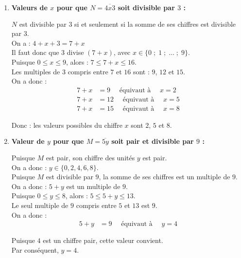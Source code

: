 \documentclass[10pt, a4paper]{article}
\begin{document}
\begin{Solution}[APPLICATION][6]
\begin{enumerate}[leftmargin=*,itemsep=0.5pt]
    \item \textbf{Valeurs de $x$ pour que $N = \overline{4x3}$ soit divisible par $3$ :}

    $N$ est divisible par $3$ si et seulement si la somme de ses chiffres est divisible par $3$. \\
    On a : $4 + x + 3 = 7 + x$ \\
    Il faut donc que $3$ divise $(7 + x)$, avec $x \in \big\{0 \; ; \; 1 \; ; \; \ldots \; ; \; 9\big\}$. \\
    Puisque $0 \leq x \leq 9$, alors : $7 \leq 7 + x \leq 16$. \\
    Les multiples de $3$ compris entre $7$ et $16$ sont : $9$, $12$ et $15$. \\
    On a donc :
    \begin{align*}
        7 + x &= 9 \quad \text{ équivaut à } \quad x = 2 \\
        7 + x &= 12 \quad \text{ équivaut à } \quad x = 5 \\
        7 + x &= 15 \quad \text{ équivaut à } \quad x = 8
    \end{align*}
    
    Donc : \quad les valeurs possibles du chiffre $x$ sont $2$, $5$ et $8$.

    \item \textbf{Valeur de $y$ pour que $M = \overline{5y}$ soit pair et divisible par $9$ :}

    Puisque $M$ est pair, son chiffre des unités $y$ est pair. \\
    On a donc : $y \in \big\{0, 2, 4, 6, 8\big\}$. \\
    Puisque $M$ est divisible par $9$, la somme de ses chiffres est un multiple de $9$. \\
    On a donc : $5 + y$ est un multiple de $9$. \\
    Puisque $0 \leq y \leq 8$, alors : $5 \leq 5 + y \leq 13$. \\
    Le seul multiple de $9$ compris entre $5$ et $13$ est $9$. \\
    On a donc :
    \begin{align*}
        5 + y &= 9 \quad \text{ équivaut à } \quad y = 4
    \end{align*}
    
    Puisque $4$ est un chiffre pair, cette valeur convient. \\
    Par conséquent, $y = 4$.
\end{enumerate}
\end{Solution}
\end{document}
